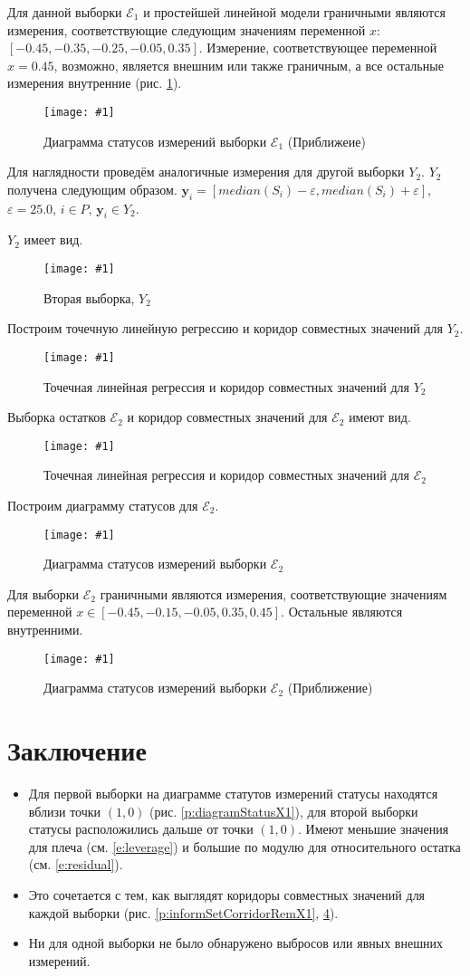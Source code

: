 \documentclass[a4paper,12pt]{article}
\newcommand{\plot}[3]{
    \begin{figure}[H]
        \begin{center}
            \texttt{[image: \#1]}
            \caption{#2}
            \label{#3}
        \end{center}
    \end{figure}
}
\begin{document}
    Для данной выборки $ \mathcal{E}_1 $ и простейшей линейной модели граничными являются
    измерения, соответствующие следующим значениям переменной $ x $: $ [-0.45, -0.35, -0.25, -0.05, 0.35] $.
    Измерение, соответствующее переменной $ x = 0.45 $, возможно, является внешним или также граничным,
    а все остальные измерения внутренние (рис. \ref{p:diagramStatusZoomX1}).
    \plot{DiagramStatusZoomX1}{Диаграмма статусов измерений выборки $ \mathcal{E}_1 $ (Приближеие)}{p:diagramStatusZoomX1}

    Для наглядности проведём аналогичные измерения для другой выборки $ Y_2 $.
    $ Y_2 $ получена следующим образом. $ \textbf{y}_i = [median(S_i) - \varepsilon, median(S_i) + \varepsilon] $,
    $ \varepsilon = 25.0 $, $ i \in P $, $ \textbf{y}_i \in Y_2 $.

    $ Y_2 $ имеет вид.
    \plot{SampleX2}{Вторая выборка, $ Y_2 $}{p:sampleX2}

    Построим точечную линейную регрессию и коридор совместных значений для $ Y_2 $.
    \plot{InformSetCorridorX2}{Точечная линейная регрессия и коридор совместных значений для $ Y_2 $}{p:informSetCorridorX2}

    Выборка остатков $ \mathcal{E}_2 $ и коридор совместных значений для $ \mathcal{E}_2 $ имеют вид.
    \plot{InformSetCorridorRemX2}{Точечная линейная регрессия и коридор совместных значений для $ \mathcal{E}_2 $}{p:informSetCorridorRemX2}

    Построим диаграмму статусов для $ \mathcal{E}_2 $.
    \plot{DiagramStatusX2}{Диаграмма статусов измерений выборки $ \mathcal{E}_2 $}{p:diagramStatusX2}

    Для выборки $ \mathcal{E}_2 $ граничными являются измерения, соответствующие значениям
    переменной $ x \in [-0.45, -0.15, -0.05, 0.35, 0.45] $.
    Остальные являются внутренними.
    \plot{DiagramStatusZoomX2}{Диаграмма статусов измерений выборки $ \mathcal{E}_2 $ (Приближение)}{p:diagramStatusZoomX2}

    \section{Заключение}
        \begin{itemize}


    \item Для первой выборки на диаграмме статутов измерений статусы находятся вблизи точки $ (1, 0) $ (рис. \ref{p:diagramStatusX1}),
    для второй выборки статусы расположились дальше от точки $ (1, 0) $. Имеют меньшие значения для плеча (см. \ref{e:leverage}) и большие по модулю для относительного остатка (см. \ref{e:residual}).
    \item Это сочетается с тем, как выглядят коридоры совместных значений для каждой выборки
    (рис. \ref{p:informSetCorridorRemX1}, \ref{p:informSetCorridorRemX2}).
    \item Ни для одной выборки не было обнаружено выбросов или явных внешних измерений.
        \end{itemize}
\end{document}
